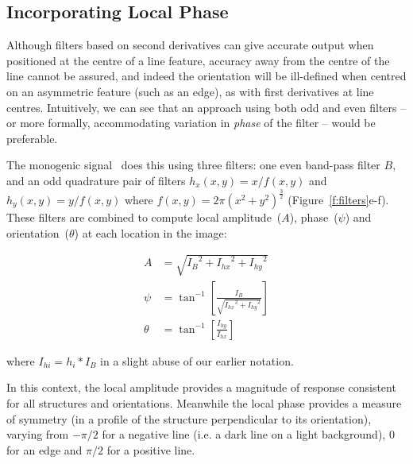 \documentclass[10pt,twocolumn,letterpaper]{article}
\newcommand{\fref}[1]{Figure~\ref{#1}}
\newcommand{\comment}[1]{}
\begin{document}
\subsection{Incorporating Local Phase}
\label{s:phase_filters}
Although filters based on second derivatives can give accurate output when positioned at the centre of a line feature, accuracy away from the centre of the line cannot be assured, and indeed the orientation will be ill-defined when centred on an asymmetric feature (such as an edge), as with first derivatives at line centres. Intuitively, we can see that an approach using both odd and even filters -- or more formally, accommodating variation in \emph{phase} of the filter -- would be preferable.

\comment{This is where using both sine and cosine parts of the Gabor filters is useful. We can largely ignore this, however, on grounds that Gabor filters are very expensive to compute.}

\comment{If we need the space, I'd consider reducing this to a paragraph that states that the monogenic signal suffers the same problems as first derivatives, despite its use of phase.}
The monogenic signal~\cite{Felsberg_Sommer_TSP01} does this using three filters: one even band-pass filter $B$, and an odd quadrature pair of filters $h_x(x,y) = x/f(x,y)$ and $h_y(x,y) = y/f(x,y)$ where $f(x,y) = 2\pi(x^2 + y^2)^{\frac{3}{2}}$ (\fref{f:filters}e-f). These filters are combined to compute local amplitude~($A$), phase~($\psi$) and orientation~($\theta$) at each location in the image:

\begin{align}
A       &= \sqrt{{I_B}^2 + {I_{hx}}^2 + {I_{hy}}^2} \label{e:ma} \\
\psi	  &= \tan^{-1}\left[ \frac{I_B}{\sqrt{{I_{hx}}^2 + {I_{hy}}^2}} \right] \label{e:mp} \\
\theta  &= \tan^{-1}\left[ \frac{I_{hy}}{I_{hx}} \right] \label{e:mt}
\end{align}

\noindent where $I_{hi} = h_i \ast I_B$ in a slight abuse of our earlier notation.
\comment{define Ib, Ihx and Ihy}

In this context, the local amplitude provides a magnitude of response consistent for all structures and orientations. Meanwhile the local phase provides a measure of symmetry (in a profile of the structure perpendicular to its orientation), varying from $-\pi/2$ for a negative line (i.e. a dark line on a light background), $0$ for an edge and $\pi/2$ for a positive line.
\end{document}
